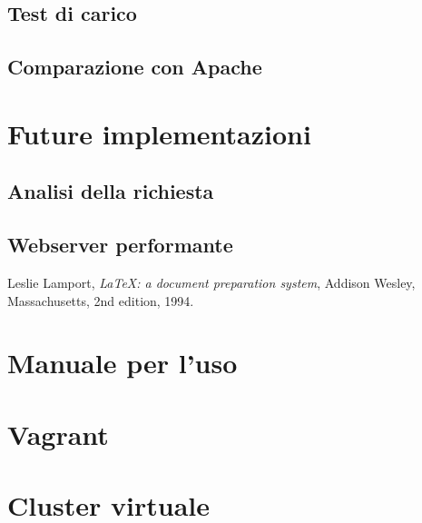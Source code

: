 \documentclass[italian]{tktltiki2}
\begin{document}
\subsection{Test di carico}
\subsection{Comparazione con Apache}
\newpage
\section{Future implementazioni}
\subsection{Analisi della richiesta}
\subsection{Webserver performante}


%
%
% 
%


\newpage
%
%
\renewcommand{\refname}{\normalfont\selectfont\normalsize\textbf{Annotazioni}} 
\begin{thebibliography}{9}
  Leslie Lamport,
  \emph{\LaTeX: a document preparation system},
  Addison Wesley, Massachusetts,
  2nd edition,
  1994.
  
\end{thebibliography}

\newpage
\appendix
 
\section{Manuale per l'uso}

\section{Vagrant}

\section{Cluster virtuale}
\end{document}
